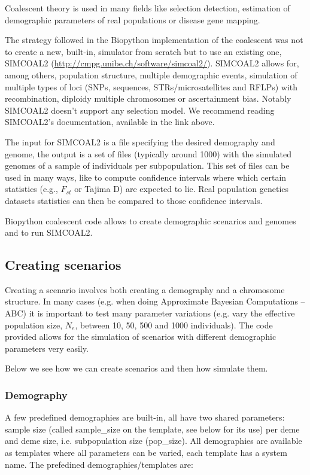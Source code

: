 \documentclass{report}
\begin{document}
Coalescent theory is used in many fields like selection detection, estimation of
demographic parameters of real populations or disease gene mapping.

The strategy followed in the Biopython implementation of the coalescent was not
to create a new, built-in, simulator from scratch but to use an existing one,
SIMCOAL2 (\url{http://cmpg.unibe.ch/software/simcoal2/}). SIMCOAL2 allows for,
among others, population structure, multiple demographic events, simulation
of multiple types of loci (SNPs, sequences, STRs/microsatellites and RFLPs)
with recombination, diploidy multiple chromosomes or ascertainment bias. Notably
SIMCOAL2 doesn't support any selection model. We recommend reading SIMCOAL2's
documentation, available in the link above.

The input for SIMCOAL2 is a file specifying the desired demography and genome,
the output is a set of files (typically around 1000) with the simulated genomes
of a sample of individuals per subpopulation. This set of files can be used
in many ways, like to compute confidence intervals where which certain
statistics (e.g., $F_{st}$ or Tajima D) are expected to lie. Real population
genetics datasets statistics can then be compared to those confidence intervals.

Biopython coalescent code allows to create demographic scenarios and genomes and
to run SIMCOAL2.

\subsection{Creating scenarios}

Creating a scenario involves both creating a demography and a chromosome structure.
In many cases (e.g. when doing Approximate Bayesian Computations -- ABC) it is
important to test many parameter variations (e.g. vary the effective population size,
$N_e$, between 10, 50, 500 and 1000 individuals). The code provided allows for
the simulation of scenarios with different demographic parameters very easily.

Below we see how we can create scenarios and then how simulate them.

\subsubsection{Demography}

A few predefined demographies are built-in, all have two shared parameters: sample size
(called sample\_size on the template, see below for its use) per deme and deme size, i.e.
subpopulation size (pop\_size). All demographies are available as templates where all
parameters can be varied, each template has a system name. The prefedined
demographies/templates are:
\end{document}
